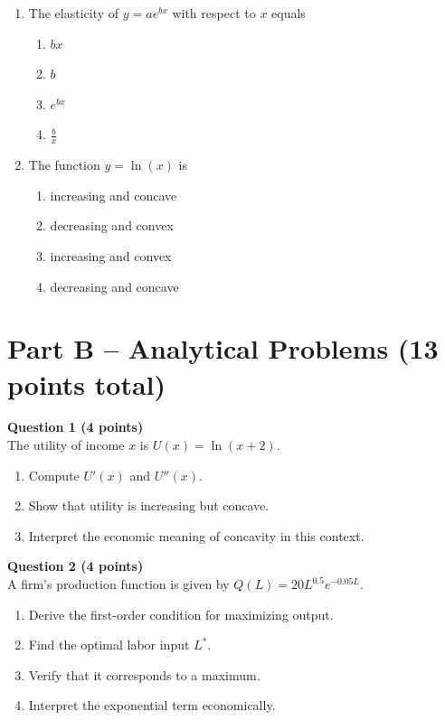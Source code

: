 \documentclass[12pt]{article}
\begin{document}
\begin{enumerate}
\item The elasticity of \( y = a e^{bx} \) with respect to \(x\) equals  
\begin{enumerate}
\item \( bx \)
\item \( b \)
\item \( e^{bx} \)
\item \( \frac{b}{x} \)
\end{enumerate}

\item The function \( y = \ln(x) \) is  
\begin{enumerate}
\item increasing and concave  
\item decreasing and convex  
\item increasing and convex  
\item decreasing and concave
\end{enumerate}
\end{enumerate}

\newpage

\section*{Part B – Analytical Problems (13 points total)}

\textbf{Question 1 (4 points)}\\
The utility of income \(x\) is \( U(x) = \ln(x + 2) \).

\begin{enumerate}
\item Compute \(U'(x)\) and \(U''(x)\).  
\item Show that utility is increasing but concave.  
\item Interpret the economic meaning of concavity in this context.
\end{enumerate}

\vspace{1em}

\textbf{Question 2 (4 points)}\\
A firm’s production function is given by \( Q(L) = 20L^{0.5}e^{-0.05L} \).

\begin{enumerate}
\item Derive the first-order condition for maximizing output.  
\item Find the optimal labor input \(L^*\).  
\item Verify that it corresponds to a maximum.  
\item Interpret the exponential term economically.
\end{enumerate}
\end{document}
